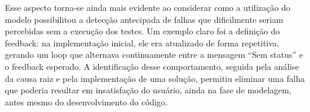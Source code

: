 
Esse aspecto torna-se ainda mais evidente ao considerar como a utilização do modelo possibilitou a detecção antecipada de falhas que dificilmente seriam percebidas sem 
a execução dos testes. Um exemplo claro foi a definição do feedback: na implementação inicial, ele era atualizado de forma repetitiva, gerando um loop que alternava 
continuamente entre a mensagem ``Sem status'' e o feedback esperado. A identificação desse comportamento, seguida pela análise da causa raiz e pela implementação de uma 
solução, permitiu eliminar uma falha que poderia resultar em insatisfação do usuário, ainda na fase de modelagem, antes mesmo do desenvolvimento do código.

